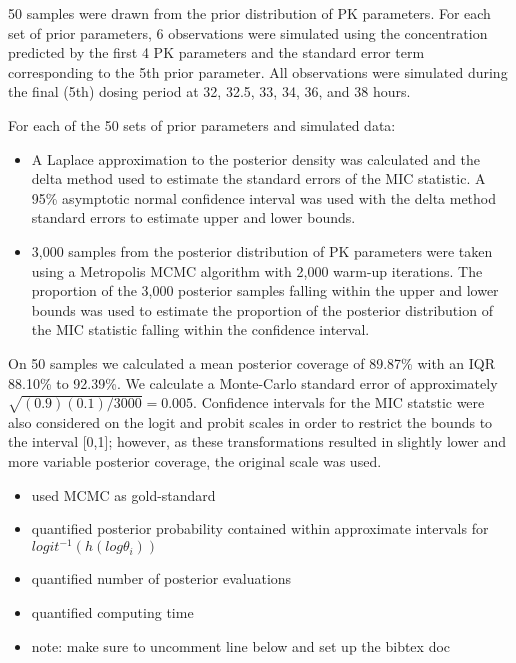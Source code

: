 \documentclass{article}\usepackage[]{graphicx}\usepackage[]{color}
\begin{document}
50 samples were drawn from the prior distribution of PK parameters. For each set of prior parameters, 6 observations were simulated using the concentration predicted by the first 4 PK parameters and the standard error term corresponding to the 5th prior parameter. All observations were simulated during the final (5th) dosing period at 32, 32.5, 33, 34, 36, and 38 hours.

For each of the 50 sets of prior parameters and simulated data:

\begin{itemize}
	 \item A Laplace approximation to the posterior density was calculated and the delta method used to estimate the standard errors of the MIC statistic. A 95\% asymptotic normal confidence interval was used with the delta method standard errors to estimate upper and lower bounds.
	 \item 3,000 samples from the posterior distribution of PK parameters were taken using a Metropolis MCMC algorithm with 2,000 warm-up iterations. The proportion of the 3,000 posterior samples falling within the upper and lower bounds was used to estimate the proportion of the posterior distribution of the MIC statistic falling within the confidence interval.
\end{itemize}

On 50 samples we calculated a mean posterior coverage of 89.87\% with an IQR 88.10\% to 92.39\%. We calculate a Monte-Carlo standard error of approximately $\sqrt{(0.9)(0.1)/3000} = 0.005$. Confidence intervals for the MIC statstic were also considered on the logit and probit scales in order to restrict the bounds to the interval [0,1]; however, as these transformations resulted in slightly lower and more variable posterior coverage, the original scale was used.


\begin{itemize}
\item used MCMC as gold-standard
\item quantified posterior probability contained within approximate intervals for $logit^{-1}(h(log \theta_i))$
\item quantified number of posterior evaluations
\item quantified computing time
\item note: make sure to uncomment line below and set up the bibtex doc
\end{itemize}
\end{document}
